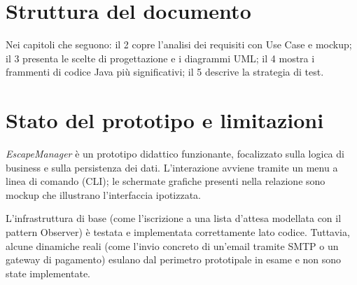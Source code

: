 \section{Struttura del documento}
Nei capitoli che seguono: il 2 copre l'analisi dei requisiti con Use Case e mockup; il 3 presenta le scelte di progettazione e i diagrammi UML; il 4 mostra i frammenti di codice Java più significativi; il 5 descrive la strategia di test.

\section{Stato del prototipo e limitazioni}
\textit{EscapeManager} è un prototipo didattico funzionante, focalizzato sulla logica di business e sulla persistenza dei dati. L'interazione avviene tramite un menu a linea di comando (CLI); le schermate grafiche presenti nella relazione sono mockup che illustrano l'interfaccia ipotizzata.

L'infrastruttura di base (come l'iscrizione a una lista d'attesa modellata con il pattern Observer) è testata e implementata correttamente lato codice. Tuttavia, alcune dinamiche reali (come l'invio concreto di un'email tramite SMTP o un gateway di pagamento) esulano dal perimetro prototipale in esame e non sono state implementate.
